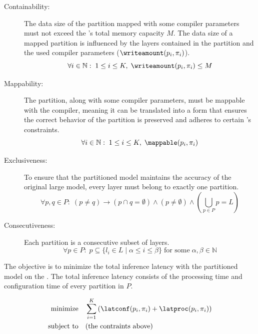 \begin{description}
    \item[Containability:]
    The data size of the partition mapped with some compiler parameters must not exceed the \graicore{}'s total memory capacity $M$.
        The data size of a mapped partition is influenced by the layers contained in the partition and the used compiler parameters ($\writeamount(p_i, \pi_i)$).
    \begin{equation}
        \forall i \in \mathbb{N}: \; 1 \leq i \leq K, \; \writeamount(p_i, \pi_i) \leq M
    \end{equation}
    \item[Mappability:]
    The partition, along with some compiler parameters, must be mappable with the compiler, meaning it can be translated into a form that ensures the correct behavior of the partition is preserved and adheres to certain \graicore{}'s constraints.
    \begin{equation}
        \forall i \in \mathbb{N}: \; 1 \leq i \leq K, \; \mappable(p_i, \pi_i)
    \end{equation}
    \item[Exclusiveness:]
    To ensure that the partitioned model maintains the accuracy of the original large model, every layer must belong to exactly one partition.
    \begin{equation}
        \forall p, q \in P: \; (p \neq q) \rightarrow (p \cap q = \emptyset) \wedge (p \neq \emptyset) \wedge (\bigcup_{p \in P} p = L)
    \end{equation}
    \item[Consecutiveness:]
    Each partition is a consecutive subset of layers.
    \begin{equation}
        \forall p \in P: \; p \subseteq \{l_i \in L \mid \alpha \leq i \leq \beta\} \; \text{for some} \;  \alpha, \beta \in \mathbb{N}
    \end{equation}
\end{description}

The objective is to minimize the total inference latency with the partitioned model on the \graicore{}.
The total inference latency consists of the processing time and configuration time of every partition in $P$.

\begin{align*}
    \textrm{minimize} & \quad \sum_{i=1}^{K} \left( \latconf(p_i, \pi_i) + \latproc(p_i, \pi_i) \right) \\
    \textrm{subject to} & \quad \textrm{(the contraints above)}
\end{align*}

